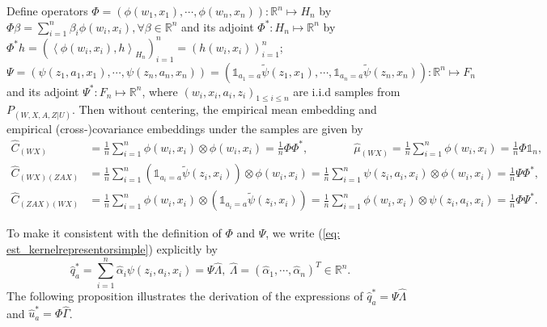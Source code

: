 Define operators $\Phi=(\phi(w_1,x_1),\cdots,\phi(w_n,x_n)):\mathbb{R}^n\mapsto H_n$ by $\Phi\beta=\sum_{i=1}^n\beta_i\phi(w_i,x_i),\forall\beta\in\mathbb{R}^n$ 
and its adjoint $\Phi^*:H_n\mapsto\mathbb{R}^n$ by $\Phi^*h=(\left\langle \phi(w_i,x_i),h\right\rangle_{H_n})_{i=1}^n=(h(w_i,x_i))_{i=1}^n$; 
$\Psi=(\psi(z_1,a_1,x_1),\cdots,\psi(z_n,a_n,x_n))=(\mathds{1}_{a_1=a}\tilde{\psi}(z_1,x_1),\cdots,\mathds{1}_{a_n=a}\tilde{\psi}(z_n,x_n)):\mathbb{R}^n\mapsto F_n$ 
and its adjoint $\Psi^*:F_n\mapsto\mathbb{R}^n$, 
where $(w_i,x_i,a_i,z_i)_{1\leq i\leq n}$ are i.i.d samples from $P_{(W,X,A,Z|U)}$. 
Then without centering, the empirical mean embedding and empirical (cross-)covariance embeddings under the samples are given by 
\begin{align*}
    \widehat{C}_{(WX)} &= \frac{1}{n}\sum_{i=1}^{n} \phi(w_i,x_i)\otimes\phi(w_i,x_i)=\frac{1}{n}\Phi\Phi^*, \qquad\qquad \widehat{\mu}_{(WX)} = \frac{1}{n}\sum_{i=1}^{n}\phi(w_i,x_i)=\frac{1}{n}\Phi\mathds{1}_n, \\
    \widehat{C}_{(WX)(ZAX)} &= \frac{1}{n}\sum_{i=1}^{n} (\mathds{1}_{a_i=a}\tilde{\psi}(z_i,x_i))\otimes\phi(w_i,x_i) = \frac{1}{n}\sum_{i=1}^{n} \psi(z_i,a_i,x_i)\otimes\phi(w_i,x_i) = \frac{1}{n}\Psi\Phi^*, \\
    \widehat{C}_{(ZAX)(WX)} &= \frac{1}{n}\sum_{i=1}^{n} \phi(w_i,x_i)\otimes(\mathds{1}_{a_i=a}\tilde{\psi}(z_i,x_i)) = \frac{1}{n}\sum_{i=1}^{n} \phi(w_i,x_i)\otimes\psi(z_i,a_i,x_i) = \frac{1}{n}\Phi\Psi^*. 
\end{align*}

To make it consistent with the definition of $\Phi$ and $\Psi$,
we write (\ref{eq: est_kernelrepresentorsimple}) explicitly by
\begin{equation}
    \label{eq: est_kernelrepresentor}
    \widehat{q}_a^* = \sum_{i=1}^{n}\widehat{\alpha}_i\psi(z_i,a_i,x_i)= \Psi\widehat{\Lambda},\ \widehat{\Lambda}=(\widehat{\alpha}_1,\cdots,\widehat{\alpha}_n)^T\in\mathbb{R}^n. 
\end{equation}
The following proposition illustrates the derivation of the expressions of $\widehat{q}_a^*=\Psi\widehat{\Lambda}$ and $\widehat{u}_a^*=\Phi\widehat{\Gamma}$. 

